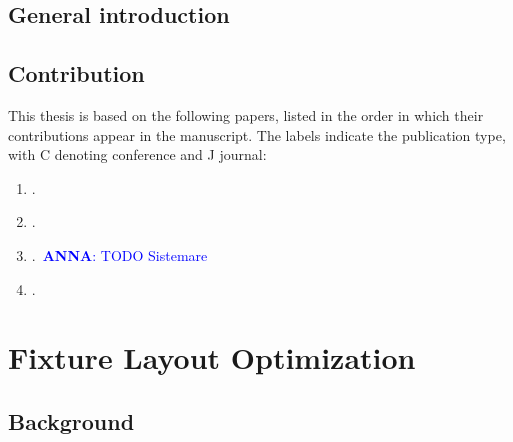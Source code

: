 \documentclass[12pt,a4paper,openright,twoside]{book}
\newcommand{\anna}[1]{\textcolor{blue}{~\textbf{ANNA}: #1}}
\begin{document}
	
	\tableofcontents
	\listoffigures     %
	\listoftables
	\listofalgorithms
	\lstlistoflistings %
	
	\mainmatter
	
	\chapter{General introduction}
	
	
	\chapter{Contribution}
	This thesis is based on the following papers, listed in the order in which their contributions appear in the manuscript. The labels indicate the publication type, with C denoting conference and J journal:
	
	\begin{enumerate}
		\item[\mbox{[C1]}]\label{paper_ppdp}
		.
		
		\item[\mbox{[C2]}]\label{paper_cp}
		.
		
		\item[\mbox{[J1]}]\label{paper_manufactoring_systems}
		.\anna{TODO Sistemare}
		
		\item[\mbox{[J2]}]\label{paper_enginering_application_ai}
		.
	\end{enumerate}
	
	\part{Fixture Layout Optimization}
	
	\chapter{Background}
	
	
\end{document}
